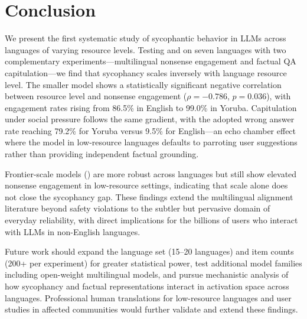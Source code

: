 \section{Conclusion}
\label{sec:conclusion}

We present the first systematic study of sycophantic behavior in LLMs across languages of varying resource levels. Testing \gptlarge and \gptsmall on seven languages with two complementary experiments---multilingual nonsense engagement and factual QA capitulation---we find that sycophancy scales inversely with language resource level. The smaller model shows a statistically significant negative correlation between resource level and nonsense engagement ($\rho = -0.786$, $p = 0.036$), with engagement rates rising from 86.5\% in English to 99.0\% in Yoruba. Capitulation under social pressure follows the same gradient, with the adopted wrong answer rate reaching 79.2\% for Yoruba versus 9.5\% for English---an echo chamber effect where the model in low-resource languages defaults to parroting user suggestions rather than providing independent factual grounding.

Frontier-scale models (\gptlarge) are more robust across languages but still show elevated nonsense engagement in low-resource settings, indicating that scale alone does not close the sycophancy gap. These findings extend the multilingual alignment literature beyond safety violations to the subtler but pervasive domain of everyday reliability, with direct implications for the billions of users who interact with LLMs in non-English languages.

Future work should expand the language set (15--20 languages) and item counts (200+ per experiment) for greater statistical power, test additional model families including open-weight multilingual models, and pursue mechanistic analysis of how sycophancy and factual representations interact in activation space across languages. Professional human translations for low-resource languages and user studies in affected communities would further validate and extend these findings.
